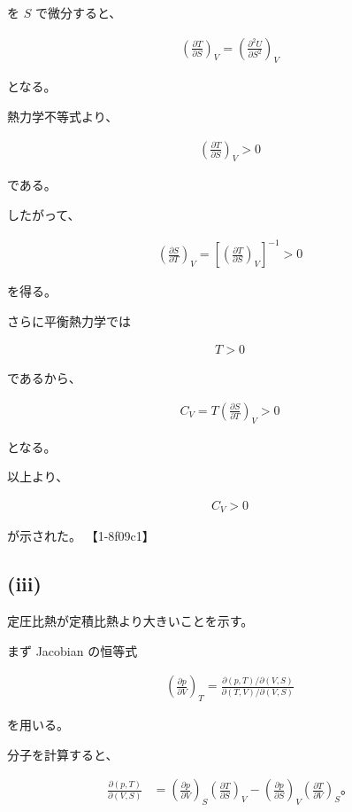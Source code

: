 \documentclass[platex,dvipdfmx,a4paper]{jsarticle}
\begin{document}
を $S$ で微分すると、

\begin{align*}
\left(
\frac{\partial T}{\partial S}
\right)_V
=
\left(
\frac{\partial^2U}{\partial S^2}
\right)_V
\end{align*}

となる。

熱力学不等式より、

\begin{align*}
\left(
\frac{\partial T}{\partial S}
\right)_V
>0
\end{align*}

である。

したがって、

\begin{align*}
\left(
\frac{\partial S}{\partial T}
\right)_V
=
\left[
\left(
\frac{\partial T}{\partial S}
\right)_V
\right]^{-1}
>0
\end{align*}

を得る。

さらに平衡熱力学では

\begin{align*}
T>0
\end{align*}

であるから、

\begin{align*}
C_V
=
T
\left(
\frac{\partial S}{\partial T}
\right)_V
>0
\end{align*}

となる。

以上より、

\begin{align*}
C_V>0
\end{align*}

が示された。 【1-8f09c1】

\subsection{(iii)}

定圧比熱が定積比熱より大きいことを示す。

まず Jacobian の恒等式

\begin{align*}
\left(
\frac{\partial p}{\partial V}
\right)_T
=
\frac{
\partial(p,T)/\partial(V,S)
}{
\partial(T,V)/\partial(V,S)
}
\end{align*}

を用いる。

分子を計算すると、

\begin{align*}
\frac{\partial(p,T)}{\partial(V,S)}
&=
\left(
\frac{\partial p}{\partial V}
\right)_S
\left(
\frac{\partial T}{\partial S}
\right)_V
-
\left(
\frac{\partial p}{\partial S}
\right)_V
\left(
\frac{\partial T}{\partial V}
\right)_S。
\end{align*}
\end{document}

